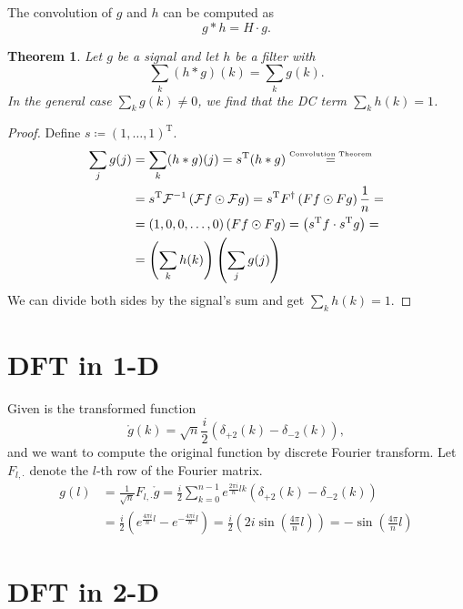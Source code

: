 \documentclass[11pt]{scrartcl}
\newcommand{\FT}{\mathcal{F}}
\newcommand{\T}{\mathrm{T}}
\newcommand{\IFT}{\mathcal{F}^{-1}}
\newcommand{\conv}{\ast}
\newcommand{\defined}{\coloneqq}
\newtheorem*{theorem}{Theorem}
\begin{document}
%
The convolution of $g$ and $h$ can be computed as 
%
\begin{equation*}
 g\conv h = H\cdot g.
\end{equation*}
%
\begin{theorem}
Let $g$ be a signal and let $h$ be a filter with 
\[
\sum_k (h\conv g)(k) = \sum_k g(k). 
\]
In the general case $\sum_k g(k) \neq 0$, we find that the DC term $\sum_k h(k) = 1$.
\end{theorem}
\begin{proof}
Define $s\defined(1,\ldots,1)^\T$.
%
\begin{align*}
\sum_j g(j) &= \sum_k (h\conv g)(j) = s^\T(h\conv g) \stackrel{\text{\tiny Convolution Theorem}}{=}\\
            &= s^\T \IFT\left(\FT f\odot\FT g\right) = s^\T F^\dagger\left(Ff\odot Fg\right)\frac{1}{n} = \\
            &= (1,0,0,\ldots,0)\left(Ff\odot Fg\right) = \left(s^\T f\cdot s^\T g\right) = \\
            &= \left(\sum_k h(k)\right)\left(\sum_j g(j)\right)
\end{align*}
%
We can divide both sides by the signal's sum and get $\sum_k h(k) = 1$.
\end{proof}

\section{DFT in 1-D}
Given is the transformed function 
\[
 \mathring g(k) = \sqrt{n}\frac{i}{2}\left(\delta_{+2}(k) - \delta_{-2}(k)\right),
\]
and we want to compute the original function by discrete Fourier transform. Let $F_{l,\cdot}$ denote the $l$-th row of the Fourier matrix.
\begin{align*}
g(l) &= \frac{1}{\sqrt n} F_{l,\cdot} \mathring g= \frac i 2 \sum_{k=0}^{n-1}e^{\frac{2\pi i}{n} l k}\left(\delta_{+2}(k) - \delta_{-2}(k)\right) \\
     &= \frac i 2 \left(e^{\frac{4\pi i}{n} l} - e^{-\frac{4\pi i}{n}l}\right) = \frac i 2 \left(2i\sin\left(\frac{4\pi}{n}l\right)\right) = -\sin\left(\frac{4\pi}{n}l\right)
\end{align*}

\section{DFT in 2-D}
\end{document}
